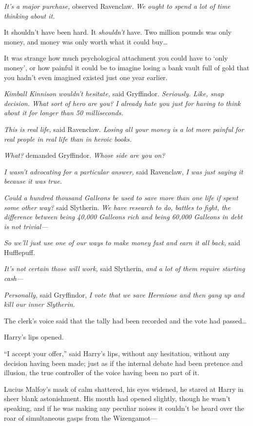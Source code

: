 \emph{It’s a major purchase,} observed Ravenclaw. \emph{We ought to spend a lot of time thinking about it.}

It shouldn’t have been hard. It \emph{shouldn’t} have. Two million pounds was only money, and money was only worth what it could buy…

It was strange how much psychological attachment you could have to ‘only money’, or how painful it could be to imagine losing a bank vault full of gold that you hadn’t even imagined existed just one year earlier.

\emph{Kimball Kinnison wouldn’t hesitate,} said Gryffindor. \emph{Seriously. Like, snap decision. What sort of hero are you? I already hate you just for having to think about it for longer than 50 milliseconds.}

\emph{This is real life,} said Ravenclaw. \emph{Losing all your money is a lot more painful for real people in real life than in heroic books.}

\emph{What?} demanded Gryffindor. \emph{Whose side are you on?}

\emph{I wasn’t advocating for a particular answer,} said Ravenclaw, \emph{I was just saying it because it was true.}

\emph{Could a hundred thousand Galleons be used to save more than one life if spent some other way?} said Slytherin. \emph{We have research to do, battles to fight, the difference between being 40,000 Galleons rich and being 60,000 Galleons in debt is not trivial—}

\emph{So we’ll just use one of our ways to make money fast and earn it all back,} said Hufflepuff.

\emph{It’s not certain those will work,} said Slytherin, \emph{and a lot of them require starting cash—}

\emph{Personally,} said Gryffindor, \emph{I vote that we save Hermione and then gang up and kill our inner Slytherin.}

The clerk’s voice said that the tally had been recorded and the vote had passed…

Harry’s lips opened.

“I accept your offer,” said Harry’s lips, without any hesitation, without any decision having been made; just as if the internal debate had been pretence and illusion, the true controller of the voice having been no part of it.

Lucius Malfoy’s mask of calm shattered, his eyes widened, he stared at Harry in sheer blank astonishment. His mouth had opened slightly, though he wasn’t speaking, and if he was making any peculiar noises it couldn’t be heard over the roar of simultaneous gasps from the Wizengamot—

